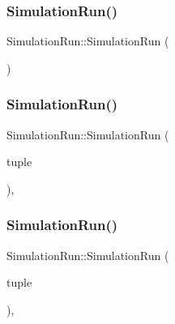 \subsubsection{\texorpdfstring{SimulationRun()}{SimulationRun()}\hspace{0.1cm}{\footnotesize\ttfamily [1/3]}}
{\footnotesize\ttfamily Simulation\+Run\+::\+Simulation\+Run (\begin{DoxyParamCaption}{ }\end{DoxyParamCaption})}

\mbox{\label{class_simulation_run_a799b66473220219ba8c2a301471213db}} 
\subsubsection{\texorpdfstring{SimulationRun()}{SimulationRun()}\hspace{0.1cm}{\footnotesize\ttfamily [2/3]}}
{\footnotesize\ttfamily Simulation\+Run\+::\+Simulation\+Run (\begin{DoxyParamCaption}\item[{\mbox{\hyperlink{class_simulation_run_a0088973963e3846e2543a2b14c686d7b}{Data\+As\+Tuple}} \&\&}]{tuple }\end{DoxyParamCaption})\hspace{0.3cm}{\ttfamily [inline]}, {\ttfamily [explicit]}}

\mbox{\label{class_simulation_run_a5accf6275958c73c95c0f628bcbe2217}} 
\subsubsection{\texorpdfstring{SimulationRun()}{SimulationRun()}\hspace{0.1cm}{\footnotesize\ttfamily [3/3]}}
{\footnotesize\ttfamily Simulation\+Run\+::\+Simulation\+Run (\begin{DoxyParamCaption}\item[{const \mbox{\hyperlink{class_simulation_run_a0088973963e3846e2543a2b14c686d7b}{Data\+As\+Tuple}} \&}]{tuple }\end{DoxyParamCaption})\hspace{0.3cm}{\ttfamily [inline]}, {\ttfamily [explicit]}}



